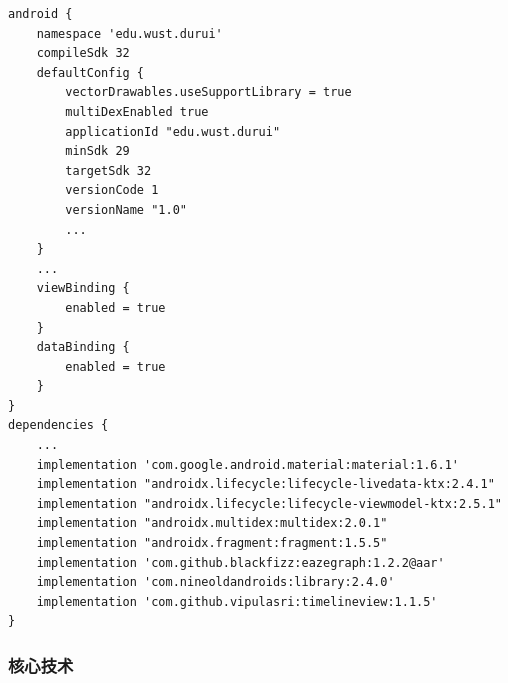 \documentclass[UTF8]{ctexart}
\begin{document}
\begin{verbatim}
android {
    namespace 'edu.wust.durui'
    compileSdk 32
    defaultConfig {
        vectorDrawables.useSupportLibrary = true
        multiDexEnabled true
        applicationId "edu.wust.durui"
        minSdk 29
        targetSdk 32
        versionCode 1
        versionName "1.0"
        ...
    }
    ...
    viewBinding {
        enabled = true
    }
    dataBinding {
        enabled = true
    }
}
dependencies {
    ...
    implementation 'com.google.android.material:material:1.6.1'
    implementation "androidx.lifecycle:lifecycle-livedata-ktx:2.4.1"
    implementation "androidx.lifecycle:lifecycle-viewmodel-ktx:2.5.1"
    implementation "androidx.multidex:multidex:2.0.1"
    implementation "androidx.fragment:fragment:1.5.5"
    implementation 'com.github.blackfizz:eazegraph:1.2.2@aar'
    implementation 'com.nineoldandroids:library:2.4.0'
    implementation 'com.github.vipulasri:timelineview:1.1.5'
}
\end{verbatim}

\subsubsection{核心技术}
\end{document}
